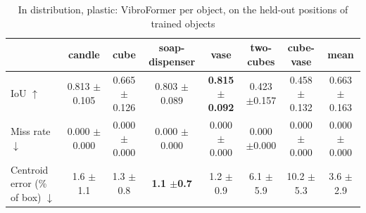 \begin{table}
\caption{In distribution, plastic: VibroFormer per object, on the held-out positions of trained objects}
\label{tab:id_plastic}
\begin{tabular}{l!{\vrule width 1.2pt}cccccc!{\vrule width 1.2pt}c}
\toprule
 & candle & cube & soap-dispenser & vase & two-cubes & cube-vase & mean \\
\midrule
IoU $\uparrow$ & 0.813 {\scriptsize $\pm$0.105} & 0.665 {\scriptsize $\pm$0.126} & 0.803 {\scriptsize $\pm$0.089} & \bfseries 0.815 {\scriptsize $\pm$0.092} & 0.423 {\scriptsize $\pm$0.157} & 0.458 {\scriptsize $\pm$0.132} & 0.663 {\scriptsize $\pm$0.163} \\
Miss rate $\downarrow$ & 0.000 {\scriptsize $\pm$0.000} & 0.000 {\scriptsize $\pm$0.000} & 0.000 {\scriptsize $\pm$0.000} & 0.000 {\scriptsize $\pm$0.000} & 0.000 {\scriptsize $\pm$0.000} & 0.000 {\scriptsize $\pm$0.000} & 0.000 {\scriptsize $\pm$0.000} \\
Centroid error (\% of box) $\downarrow$ & 1.6 {\scriptsize $\pm$1.1} & 1.3 {\scriptsize $\pm$0.8} & \bfseries 1.1 {\scriptsize $\pm$0.7} & 1.2 {\scriptsize $\pm$0.9} & 6.1 {\scriptsize $\pm$5.9} & 10.2 {\scriptsize $\pm$5.3} & 3.6 {\scriptsize $\pm$2.9} \\
\bottomrule
\end{tabular}
\end{table}
